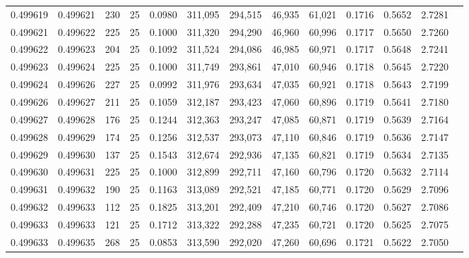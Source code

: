 \begin{tabular}{rrrrrrrrrrrrr}
0.499619 & 0.499621 & 230 &  25 &                                     0.0980 & 311,095 & 294,515 &  46,935 &  61,021 & 0.1716 & 0.5652 & 2.7281 \\
0.499621 & 0.499622 & 225 &  25 &                                     0.1000 & 311,320 & 294,290 &  46,960 &  60,996 & 0.1717 & 0.5650 & 2.7260 \\
0.499622 & 0.499623 & 204 &  25 &                                     0.1092 & 311,524 & 294,086 &  46,985 &  60,971 & 0.1717 & 0.5648 & 2.7241 \\
0.499623 & 0.499624 & 225 &  25 &                                     0.1000 & 311,749 & 293,861 &  47,010 &  60,946 & 0.1718 & 0.5645 & 2.7220 \\
0.499624 & 0.499626 & 227 &  25 &                                     0.0992 & 311,976 & 293,634 &  47,035 &  60,921 & 0.1718 & 0.5643 & 2.7199 \\
0.499626 & 0.499627 & 211 &  25 &                                     0.1059 & 312,187 & 293,423 &  47,060 &  60,896 & 0.1719 & 0.5641 & 2.7180 \\
0.499627 & 0.499628 & 176 &  25 &                                     0.1244 & 312,363 & 293,247 &  47,085 &  60,871 & 0.1719 & 0.5639 & 2.7164 \\
0.499628 & 0.499629 & 174 &  25 &                                     0.1256 & 312,537 & 293,073 &  47,110 &  60,846 & 0.1719 & 0.5636 & 2.7147 \\
0.499629 & 0.499630 & 137 &  25 &                                     0.1543 & 312,674 & 292,936 &  47,135 &  60,821 & 0.1719 & 0.5634 & 2.7135 \\
0.499630 & 0.499631 & 225 &  25 &                                     0.1000 & 312,899 & 292,711 &  47,160 &  60,796 & 0.1720 & 0.5632 & 2.7114 \\
0.499631 & 0.499632 & 190 &  25 &                                     0.1163 & 313,089 & 292,521 &  47,185 &  60,771 & 0.1720 & 0.5629 & 2.7096 \\
0.499632 & 0.499633 & 112 &  25 &                                     0.1825 & 313,201 & 292,409 &  47,210 &  60,746 & 0.1720 & 0.5627 & 2.7086 \\
0.499633 & 0.499633 & 121 &  25 &                                     0.1712 & 313,322 & 292,288 &  47,235 &  60,721 & 0.1720 & 0.5625 & 2.7075 \\
0.499633 & 0.499635 & 268 &  25 &                                     0.0853 & 313,590 & 292,020 &  47,260 &  60,696 & 0.1721 & 0.5622 & 2.7050 \\

\end{tabular}
